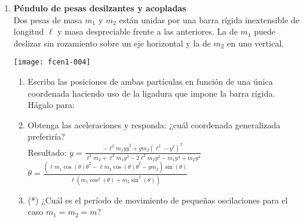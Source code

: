 \documentclass[11pt, spanish, a4paper, twoside]{article}
\begin{document}
\begin{enumerate}
	\item 
	\begin{minipage}[t][1.5cm]{0.7\textwidth}
		\textbf{Péndulo de pesas desilzantes y acopladas}\\ 
		Dos pesas de masa \(m_1\) y \(m_2\) están unidas por una barra rígida inextensible de longitud \(\ell\) y masa despreciable frente a las anteriores.
		La de \(m_1\) puede deslizar sin rozamiento sobre un eje horizontal y la de \(m_2\) en uno vertical.
	\end{minipage}
	\begin{minipage}[c][3cm][t]{0.3\textwidth}
		\texttt{[image: fcen1-004]}
	\end{minipage}
	\begin{enumerate}
		\item Escriba las posiciones de ambas partículas en función de una única coordenada haciendo uso de la ligadura que impone la barra rígida.
		Hágalo para:
		\item Obtenga las aceleraciones y responda: ¿cuál coordenada generalizada preferiría?\\
		Resultado:
			$\ddot{y} = \frac{- \ell^{2} m_{1} y \dot{y}^{2} + g m_{2} \left(\ell^{2} - y^{2}\right)^{2}}{\ell^{4} m_{2} + \ell^{2} m_{1} y^{2} - 2 \ell^{2} m_{2} y^{2} - m_{1} y^{4} + m_{2} y^{4}}$
			\qquad
			$\ddot{\theta} = \frac{\left(\ell m_{1} \cos{\left(\theta \right)} \dot{\theta}^{2} - \ell m_{2} \cos{\left(\theta \right)} \dot{\theta}^{2} - g m_{2}\right) \sin{\left(\theta \right)}}{\ell \left(m_{1} \cos^{2}{\left(\theta \right)} + m_{2} \sin^{2}{\left(\theta \right)}\right)}$
		\item (*) ¿Cuál es el período de movimiento de pequeñas oscilaciones para el caso \(m_1 = m_2 = m\)?
	\end{enumerate}




\end{enumerate}
\end{document}
